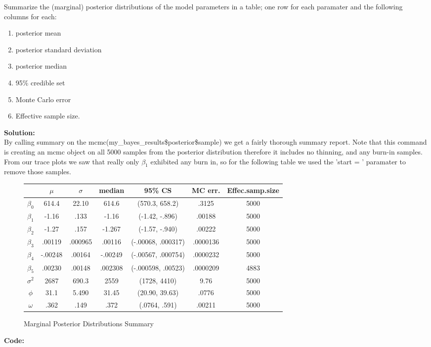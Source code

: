 \documentclass[12pt]{article}
\makeatletter
\theoremstyle{homework}
\newenvironment{exercise}[1]
{\def\@currentlabel{#1}\exercisecore}
{\endexercisecore}
\newcommand{\localhead}[1]{\par\smallskip\noindent\textbf{#1}\nobreak\\}%
\newcommand\solution{\localhead{Solution:}}
\makeatother
\begin{document}
\begin{exercise}{5} Summarize the (marginal) posterior distributions of the model parameters in a table; one row for each paramater and 
  the following columns for each:
  \begin{enumerate}
    \item posterior mean
    \item posterior standard deviation
    \item posterior median
    \item 95\% credible set 
    \item Monte Carlo error
    \item Effective sample size.
  \end{enumerate}
  \solution By calling summary on the mcmc(my\_bayes\_results\$posterior\$sample) we get a fairly thorough summary report. Note that this command 
  is creating an mcmc object on all 5000 samples from the posterior distribution therefore it includes no thinning, and any burn-in samples. From our trace 
  plots we saw that really only $\beta_1$ exhibited any burn in, so for the following table we used the 'start = '  paramater to remove those samples. 
  \begin{figure}[H]
    \begin{center}
      \caption{Marginal Posterior Distributions Summary}
    \begin{tabular}{|c||c|c|c|c|c|c| }
      \hline
       &  $\mu$ & $\sigma$ & median & 95\% CS & MC err. & Effec.samp.size\\
      \hline 
      $\beta_0$  & 614.4      &  22.10      & 614.6     & (570.3, 658.2)     & .3125     & 5000 \\
      $\beta_1$  &-1.16       &  .133       &-1.16      & (-1.42, -.896)     & .00188    & 5000 \\
      $\beta_2$  &-1.27       &  .157       &-1.267     & (-1.57, -.940)     & .00222    & 5000 \\
      $\beta_3$  & .00119     &  .000965    & .00116    & (-.00068, .000317) & .0000136  & 5000 \\
      $\beta_4$  &-.00248     &  .00164     &-.00249    & (-.00567, .000754) & .0000232  & 5000 \\
      $\beta_5$  & .00230     &  .00148     & .002308   & (-.000598, .00523) & .0000209  & 4883 \\
      $\sigma^2$ & 2687       &  690.3      & 2559      & (1728, 4410)       & 9.76      & 5000 \\
      $\phi$     & 31.1       &  5.490      & 31.45     & (20.90, 39.63)     & .0776     & 5000 \\
      $\omega$   & .362       &  .149       & .372      & (.0764, .591)      & .00211    & 5000 \\
      \hline
      \hline
     \end{tabular}
    \end{center}
  \end{figure}
  \textbf{Code:}
  \begin{center}
  
  \end{center}
\end{exercise}
\end{document}
